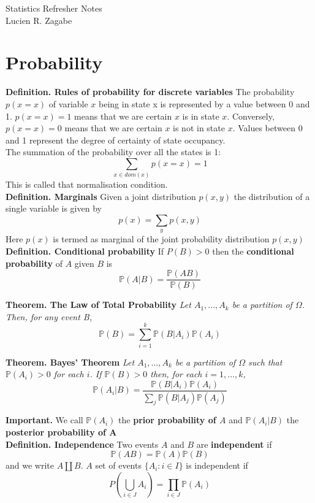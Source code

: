 \documentclass[11pt,a4paper]{report}
\begin{document}
\begin{center}
  {\large Statistics Refresher Notes}\\[.5cm]
  {\small Lucien R. Zagabe}\\[1cm]
\end{center}

\section*{Probability}

\noindent \textbf{Definition. Rules of probability for discrete
variables} The probability $p(x = x)$ of variable $x$ being in state x
is represented by a value between 0 and 1. $p(x = x) = 1$ means that
we are certain $x$ is in state $x$. Conversely, $p(x = x) = 0$ means
that we are certain $x$ is not in state $x$. Values between 0 and 1
represent the degree of certainty of state occupancy.\\
The summation of the probability over all the states is 1:
$$\sum_{x \in dom(x)}p(x = x) = 1$$
This is called that normalisation condition.\\

\noindent \textbf{Definition. Marginals} Given a joint distribution
$p(x, y)$ the distribution of a single variable is given by
$$p(x) = \sum_{y}p(x, y)$$
Here $p(x)$ is termed as marginal of the joint probability distribution
$p(x, y)$\\

\noindent \textbf{Definition. Conditional probability} If $P(B) > 0$
then the \textbf{conditional probability} of $A$ given $B$ is
$$\mathbb{P}(A|B) = \dfrac{\mathbb{P}(AB)}{\mathbb{P}(B)}$$

\noindent \textbf{Theorem. The Law of Total Probability} \emph{Let
  $A_1,...,A_k$ be a partition of $\Omega$. Then, for any event B, }
$$\mathbb{P}(B) = \sum_{i = 1}^{k} \mathbb{P}(B | A_i)\mathbb{P}(A_i)$$

\noindent \textbf{Theorem. Bayes' Theorem} \emph{Let $A_1,...,A_k$
  be a partition of $\Omega$ such that $\mathbb{P}(A_i) > 0$
  for each $i$. If $\mathbb{P}(B) > 0$ then, for each $i = 1,...,k$,}
$$\mathbb{P}(A_i|B) =
  \dfrac{\mathbb{P}(B|A_i)\mathbb{P}(A_i)}{\sum_{j}\mathbb{P}(B|A_j)\mathbb{P}(A_j)}$$

\noindent \textbf{Important.} We call $\mathbb{P}(A_i)$ the \textbf{prior
  probability of $A$} and $\mathbb{P}(A_i|B)$ the \textbf{posterior
  probability of A}\\

\noindent \textbf{Definition. Independence} Two events $A$ and $B$ are
\textbf{independent} if
$$\mathbb{P}(AB) = \mathbb{P}(A)\mathbb{P}(B)$$
and we write $A \amalg B$. $A$ set of events $\{A_i: i \in I\}$ is
independent if
$$P(\bigcup_{i \in J}A_i) = \prod_{i \in J}\mathbb{P}(A_i)$$
\end{document}
